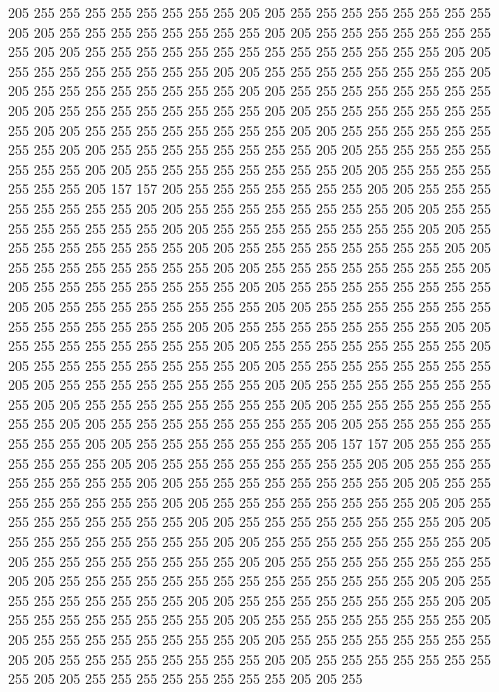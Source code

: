 205 255 255 255 255 255 255 255 255 205 205 255 255 255 255 255 255 255 255 205
205 255 255 255 255 255 255 255 255 205 205 255 255 255 255 255 255 255 255 205
205 255 255 255 255 255 255 255 255 255 255 255 255 255 255 205 205 255 255 255
255 255 255 255 255 205 205 255 255 255 255 255 255 255 255 205 205 255 255 255
255 255 255 255 255 205 205 255 255 255 255 255 255 255 255 205 205 255 255 255
255 255 255 255 255 205 205 255 255 255 255 255 255 255 255 205 205 255 255 255
255 255 255 255 255 205 205 255 255 255 255 255 255 255 255 205 205 255 255 255
255 255 255 255 255 205 205 255 255 255 255 255 255 255 255 205 205 255 255 255
255 255 255 255 255 205 205 255 255 255 255 255 255 255 205 157 157 205 255 255
255 255 255 255 255 205 205 255 255 255 255 255 255 255 255 205 205 255 255 255
255 255 255 255 255 205 205 255 255 255 255 255 255 255 255 205 205 255 255 255
255 255 255 255 255 205 205 255 255 255 255 255 255 255 255 205 205 255 255 255
255 255 255 255 255 205 205 255 255 255 255 255 255 255 255 205 205 255 255 255
255 255 255 255 255 205 205 255 255 255 255 255 255 255 255 205 205 255 255 255
255 255 255 255 255 205 205 255 255 255 255 255 255 255 255 205 205 255 255 255
255 255 255 255 255 255 255 255 255 255 255 205 205 255 255 255 255 255 255 255
255 205 205 255 255 255 255 255 255 255 255 205 205 255 255 255 255 255 255 255
255 205 205 255 255 255 255 255 255 255 255 205 205 255 255 255 255 255 255 255
255 205 205 255 255 255 255 255 255 255 255 205 205 255 255 255 255 255 255 255
255 205 205 255 255 255 255 255 255 255 255 205 205 255 255 255 255 255 255 255
255 205 205 255 255 255 255 255 255 255 255 205 205 255 255 255 255 255 255 255
255 205 205 255 255 255 255 255 255 255 205 157 157 205 255 255 255 255 255 255
255 205 205 255 255 255 255 255 255 255 255 205 205 255 255 255 255 255 255 255
255 205 205 255 255 255 255 255 255 255 255 205 205 255 255 255 255 255 255 255
255 205 205 255 255 255 255 255 255 255 255 205 205 255 255 255 255 255 255 255
255 205 205 255 255 255 255 255 255 255 255 205 205 255 255 255 255 255 255 255
255 205 205 255 255 255 255 255 255 255 255 205 205 255 255 255 255 255 255 255
255 205 205 255 255 255 255 255 255 255 255 205 205 255 255 255 255 255 255 255
255 255 255 255 255 255 255 205 205 255 255 255 255 255 255 255 255 205 205 255
255 255 255 255 255 255 255 205 205 255 255 255 255 255 255 255 255 205 205 255
255 255 255 255 255 255 255 205 205 255 255 255 255 255 255 255 255 205 205 255
255 255 255 255 255 255 255 205 205 255 255 255 255 255 255 255 255 205 205 255
255 255 255 255 255 255 255 205 205 255 255 255 255 255 255 255 255 205 205 255
